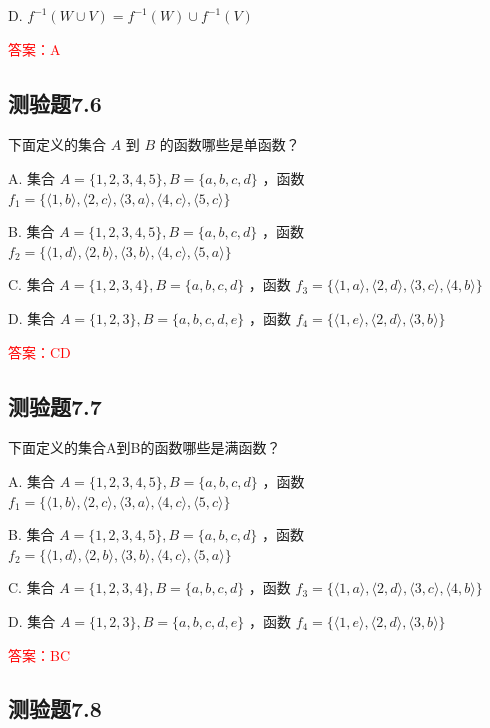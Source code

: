 \documentclass[UTF8, heading=true]{ctexart}
\begin{document}
D. $f^{-1}(W \cup V)=f^{-1}(W) \cup f^{-1}(V)$

\textcolor{red}{答案：A}


\subsection{测验题7.6}

下面定义的集合 $A$ 到 $B$ 的函数哪些是单函数？

A. 集合 $A=\{1,2,3,4,5\}, B=\{a, b, c, d\}$ ，函数 $f_1=\{\langle 1, b\rangle,\langle 2, c\rangle,\langle 3, a\rangle,\langle 4, c\rangle,\langle 5, c\rangle\}$

B. 集合 $A=\{1,2,3,4,5\}, B=\{a, b, c, d\}$ ，函数 $f_2=\{\langle 1, d\rangle,\langle 2, b\rangle,\langle 3, b\rangle,\langle 4, c\rangle,\langle 5, a\rangle\}$

C. 集合 $A=\{1,2,3,4\}, B=\{a, b, c, d\}$ ，函数 $f_3=\{\langle 1, a\rangle,\langle 2, d\rangle,\langle 3, c\rangle,\langle 4, b\rangle\}$

D. 集合 $A=\{1,2,3\}, B=\{a, b, c, d, e\}$ ，函数 $f_4=\{\langle 1, e\rangle,\langle 2, d\rangle,\langle 3, b\rangle\}$

\textcolor{red}{答案：CD}

\subsection{测验题7.7}

下面定义的集合A到B的函数哪些是满函数？

A. 集合 $A=\{1,2,3,4,5\}, B=\{a, b, c, d\}$ ，函数 $f_1=\{\langle 1, b\rangle,\langle 2, c\rangle,\langle 3, a\rangle,\langle 4, c\rangle,\langle 5, c\rangle\}$

B. 集合 $A=\{1,2,3,4,5\}, B=\{a, b, c, d\}$ ，函数 $f_2=\{\langle 1, d\rangle,\langle 2, b\rangle,\langle 3, b\rangle,\langle 4, c\rangle,\langle 5, a\rangle\}$

C. 集合 $A=\{1,2,3,4\}, B=\{a, b, c, d\}$ ，函数 $f_3=\{\langle 1, a\rangle,\langle 2, d\rangle,\langle 3, c\rangle,\langle 4, b\rangle\}$

D. 集合 $A=\{1,2,3\}, B=\{a, b, c, d, e\}$ ，函数 $f_4=\{\langle 1, e\rangle,\langle 2, d\rangle,\langle 3, b\rangle\}$


\textcolor{red}{答案：BC}

\subsection{测验题7.8}
\end{document}
